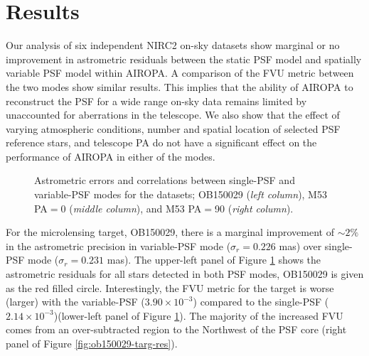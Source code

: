 \documentclass[]{spie}  %
\begin{document}

\section{Results} \label{sec:fvu-astrom-results}
Our analysis of six independent NIRC2 on-sky datasets show marginal or no improvement in astrometric residuals between the static PSF model and spatially variable PSF model within AIROPA. A comparison of the FVU metric between the two modes show similar results. This implies that the ability of AIROPA to reconstruct the PSF for a wide range on-sky data remains limited by unaccounted for aberrations in the telescope. We also show that the effect of varying atmospheric conditions, number and spatial location of selected PSF reference stars, and telescope PA do not have a significant effect on the performance of AIROPA in either of the modes.

\begin{figure}[!h]
 \caption{\footnotesize Astrometric errors and correlations between single-PSF and variable-PSF modes for the datasets; OB150029 (\textit{left column}), M53 PA$=$0 (\textit{middle column}), and M53 PA$=$90 (\textit{right column}).} \label{fig:ob-m53-astrom}
\end{figure}

\indent For the microlensing target, OB150029, there is a marginal improvement of ${\sim}2\%$ in the astrometric precision in variable-PSF mode ($\sigma_{r}=0.226$ mas) over single-PSF mode ($\sigma_{r}=0.231$ mas). The upper-left panel of Figure \ref{fig:ob-m53-astrom} shows the astrometric residuals for all stars detected in both PSF modes, OB150029 is given as the red filled circle. Interestingly, the FVU metric for the target is worse (larger) with the variable-PSF ($3.90\times10^{-3}$) compared to the single-PSF ($2.14\times10^{-3}$)(lower-left panel of Figure \ref{fig:ob-m53-astrom}). 
The majority of the increased FVU comes from an over-subtracted region to the Northwest of the PSF core (right panel of Figure \ref{fig:ob150029-targ-res}).
\end{document}
